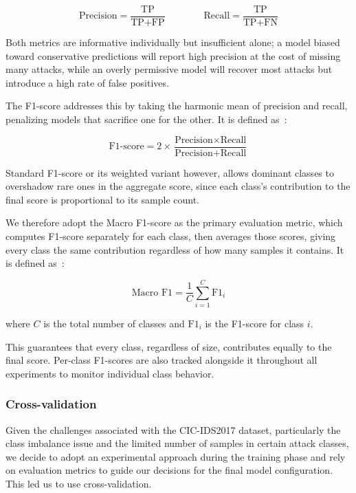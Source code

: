 \begin{equation*}
    \label{eq:precision_recall}
    \text{Precision} = \frac{\text{TP}}{\text{TP} + \text{FP}} \qquad\qquad
    \text{Recall} = \frac{\text{TP}}{\text{TP} + \text{FN}}
\end{equation*}

Both metrics are informative individually but insufficient alone; a model biased toward conservative predictions will report high precision at the cost of missing many attacks, while an overly permissive model will recover most attacks but introduce a high rate of false positives.

The F1-score addresses this by taking the harmonic mean of precision and recall, penalizing models that sacrifice one for the other. It is defined as~\cite{powers2011evaluation}:

\begin{equation*}
    \label{eq:f1}
    \text{F1-score} = 2 \times \frac{\text{Precision} \times \text{Recall}}{\text{Precision} + \text{Recall}}
\end{equation*}


Standard F1-score or its weighted variant however, allows dominant classes to overshadow rare ones in the aggregate score, since each class's contribution to the final score is proportional to its sample count.

We therefore adopt the Macro F1-score as the primary evaluation metric, which computes F1-score separately for each class, then averages those scores, giving every class the same contribution regardless of how many samples it contains. It is defined as~\cite{sokolova2009systematic}:

\begin{equation*}
    \label{eq:macro_f1}
    \text{Macro F1} = \frac{1}{C} \sum_{i=1}^{C} \text{F1}_i
\end{equation*}


where $C$ is the total number of classes and $\text{F1}_i$ is the F1-score for class $i$.

This guarantees that every class, regardless of size, contributes equally to the final score.
Per-class F1-scores are also tracked alongside it throughout all experiments to monitor individual class behavior.
\vspace{1cm}
\subsubsection{Cross-validation}
Given the challenges associated with the CIC-IDS2017 dataset, particularly the class imbalance issue and the limited number of samples in certain attack classes, we decide to adopt an experimental approach during the training phase and rely on evaluation metrics to guide our decisions for the final model configuration. This led us to use cross-validation.

